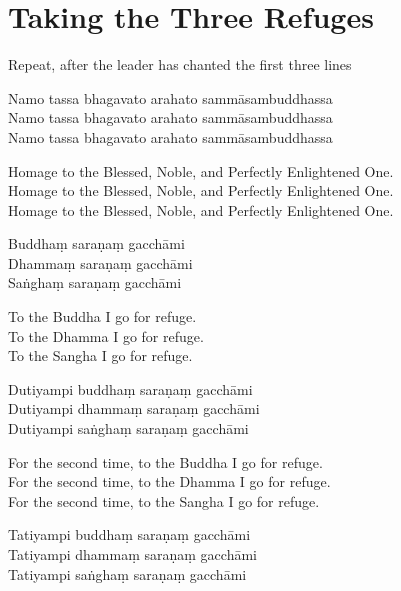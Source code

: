 \clearpage
\chapter{Taking the Three Refuges}%

\begin{instruction}
  Repeat, after the leader has chanted the first three lines
\end{instruction}

Namo tassa bhagavato arahato sammāsambuddhassa\\
Namo tassa bhagavato arahato sammāsambuddhassa\\
Namo tassa bhagavato arahato sammāsambuddhassa

\begin{english}
  Homage to the Blessed, Noble, and Perfectly Enlightened One.\\
  Homage to the Blessed, Noble, and Perfectly Enlightened One.\\
  Homage to the Blessed, Noble, and Perfectly Enlightened One.
\end{english}

Buddhaṃ saraṇaṃ gacchāmi\\
Dhammaṃ saraṇaṃ gacchāmi\\
Saṅghaṃ saraṇaṃ gacchāmi

\begin{english}
  To the Buddha I go for refuge.\\
  To the Dhamma I go for refuge.\\
  To the Sangha I go for refuge.
\end{english}

Dutiyampi buddhaṃ saraṇaṃ gacchāmi\\
Dutiyampi dhammaṃ saraṇaṃ gacchāmi\\
Dutiyampi saṅghaṃ saraṇaṃ gacchāmi

\begin{english}
  For the second time, to the Buddha I go for refuge.\\
  For the second time, to the Dhamma I go for refuge.\\
  For the second time, to the Sangha I go for refuge.
\end{english}

Tatiyampi buddhaṃ saraṇaṃ gacchāmi\\
Tatiyampi dhammaṃ saraṇaṃ gacchāmi\\
Tatiyampi saṅghaṃ saraṇaṃ gacchāmi

\clearpage

